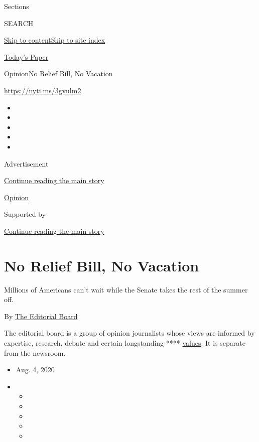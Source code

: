 Sections

SEARCH

\protect\hyperlink{site-content}{Skip to
content}\protect\hyperlink{site-index}{Skip to site index}

\href{https://myaccount.nytimes.com/auth/login?response_type=cookie\&client_id=vi}{}

\href{https://www.nytimes.com/section/todayspaper}{Today's Paper}

\href{/section/opinion}{Opinion}\textbar{}No Relief Bill, No Vacation

\url{https://nyti.ms/3gvulm2}

\begin{itemize}
\item
\item
\item
\item
\item
\end{itemize}

Advertisement

\protect\hyperlink{after-top}{Continue reading the main story}

\href{/section/opinion}{Opinion}

Supported by

\protect\hyperlink{after-sponsor}{Continue reading the main story}

\hypertarget{no-relief-bill-no-vacation}{%
\section{No Relief Bill, No Vacation}\label{no-relief-bill-no-vacation}}

Millions of Americans can't wait while the Senate takes the rest of the
summer off.

By
\href{https://www.nytimes.com/interactive/opinion/editorialboard.html}{The
Editorial Board}

The editorial board is a group of opinion journalists whose views are
informed by expertise, research, debate and certain longstanding ****
\href{https://www.nytimes.com/interactive/2018/opinion/editorialboard.html}{values}.
It is separate from the newsroom.

\begin{itemize}
\item
  Aug. 4, 2020
\item
  \begin{itemize}
  \item
  \item
  \item
  \item
  \item
  \end{itemize}
\end{itemize}

